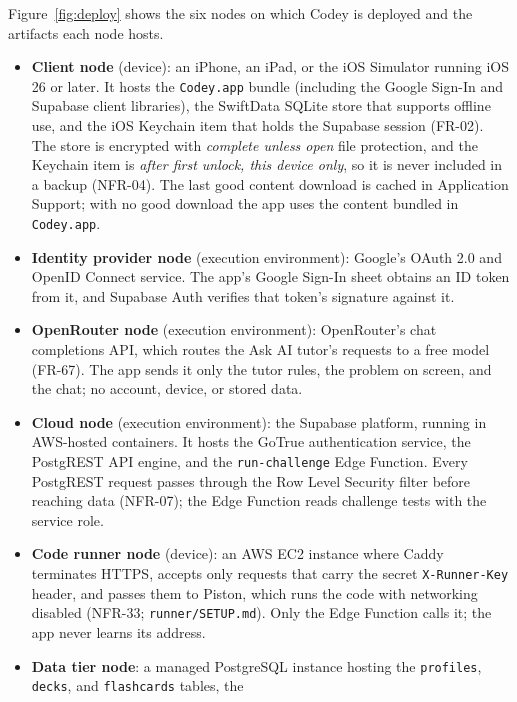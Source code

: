 \documentclass[12pt,letterpaper]{article}
\newcommand{\st}[1]{\guillemotleft#1\guillemotright}   %
\begin{document}
Figure~\ref{fig:deploy} shows the six nodes on which Codey is deployed and the
artifacts each node hosts.
\begin{itemize}
  \item \textbf{Client node} (\st{device}): an iPhone, an iPad, or the iOS Simulator running
        iOS 26 or later. It hosts the \texttt{Codey.app} bundle (including the Google
        Sign-In and Supabase client libraries), the SwiftData SQLite store that
        supports offline use, and the iOS Keychain item that holds the Supabase
        session (FR-02). The store is encrypted with \emph{complete unless open} file
        protection, and the Keychain item is \emph{after first unlock, this device
        only}, so it is never included in a backup (NFR-04). The last good content
        download is cached in Application Support; with no good download the app
        uses the content bundled in \texttt{Codey.app}.
  \item \textbf{Identity provider node} (\st{execution environment}): Google's OAuth
        2.0 and OpenID Connect service. The app's Google Sign-In sheet obtains an ID
        token from it, and Supabase Auth verifies that token's signature against it.
  \item \textbf{OpenRouter node} (\st{execution environment}): OpenRouter's chat
        completions API, which routes the Ask AI tutor's requests to a free model
        (FR-67). The app sends it only the tutor rules, the problem on screen, and the
        chat; no account, device, or stored data.
  \item \textbf{Cloud node} (\st{execution environment}): the Supabase platform,
        running in AWS-hosted containers. It hosts the GoTrue authentication service,
        the PostgREST API engine, and the \texttt{run-challenge} Edge Function. Every
        PostgREST request passes through the Row Level Security filter before reaching
        data (NFR-07); the Edge Function reads challenge tests with the service role.
  \item \textbf{Code runner node} (\st{device}): an AWS EC2 instance where Caddy
        terminates HTTPS, accepts only requests that carry the secret
        \texttt{X-Runner-Key} header, and passes them to Piston, which runs the code
        with networking disabled (NFR-33; \texttt{runner/SETUP.md}). Only the Edge
        Function calls it; the app never learns its address.
  \item \textbf{Data tier node}: a managed PostgreSQL instance hosting the
        \texttt{profiles}, \texttt{decks}, and \texttt{flashcards} tables, the

\end{itemize}
\end{document}

